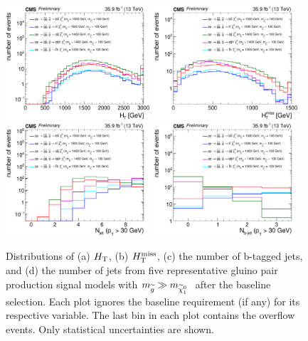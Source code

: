 \begin{figure}[htb]
  \begin{center}
    \includegraphics[width=0.48\textwidth]{supplementary/ht_gg_uncompressed_tree_signalMinusHT.pdf}
    \includegraphics[width=0.48\textwidth]{supplementary/mht_gg_uncompressed_tree_signalMinusMHT.pdf} \\
    \includegraphics[width=0.48\textwidth]{supplementary/njets_gg_uncompressed_tree_signalMinusNJet.pdf}
    \includegraphics[width=0.48\textwidth]{supplementary/nbjets_gg_uncompressed_tree_signal.pdf}
  \end{center}
  \caption{
    Distributions of (a) $H_{\rm T}$, (b) $H_{\rm T}^{\rm miss}$, (c) the number
    of b-tagged jets, and (d) the number of jets from five representative gluino pair production signal models with ${m_{\widetilde{g}} \gg m_{\widetilde{\chi}^{0}_{1}~}}$
    after the baseline selection.
    Each plot ignores the
    baseline requirement (if any) for its respective variable. The
    last bin in each plot contains the overflow events. Only
    statistical uncertainties are shown.\\
  }
  \label{fig:fastsim-Nminus1-gg-uncompressed}
\end{figure}


